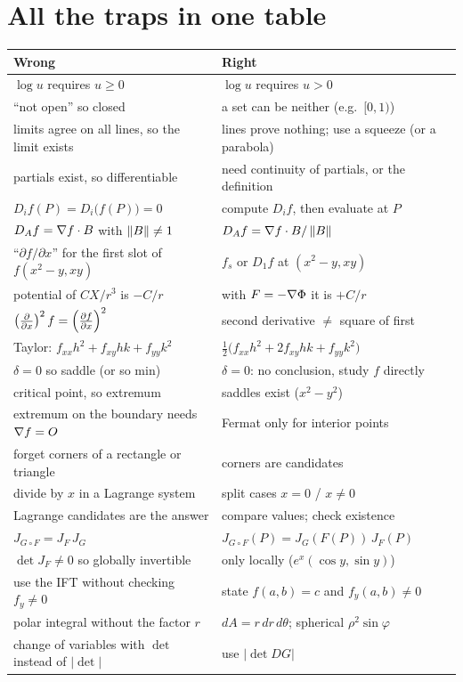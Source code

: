 \section{All the traps in one table}

\begin{center}\small
\begin{tabularx}{\linewidth}{@{}Y Y@{}}
\toprule
\textbf{\color{coralD}Wrong} & \textbf{\color{tealD}Right}\\ \midrule
$\log u$ requires $u\ge0$ & $\log u$ requires $u>0$\\
``not open'' so closed & a set can be neither (e.g.\ $[0,1)$)\\
limits agree on all lines, so the limit exists & lines prove nothing; use a squeeze (or a parabola)\\
partials exist, so differentiable & need continuity of partials, or the definition\\
$D_if(P)=D_i\big(f(P)\big)=0$ & compute $D_if$, then evaluate at $P$\\
$D_Af=\nabla f\cdot B$ with $\left\lVert B\right\rVert\ne1$ & $D_Af=\nabla f\cdot B/\left\lVert B\right\rVert$\\
``$\partial f/\partial x$'' for the first slot of $f(x^2-y,xy)$ & $f_s$ or $D_1f$ at $(x^2-y,xy)$\\
potential of $CX/r^3$ is $-C/r$ & with $F=-\nabla\Phi$ it is $+C/r$\\
$\left(\frac{\partial }{\partial x}\right)^2f=\left(\frac{\partial f}{\partial x}\right)^2$ & second derivative $\neq$ square of first\\
Taylor: $f_{xx}h^2+f_{xy}hk+f_{yy}k^2$ & $\tfrac12\big(f_{xx}h^2+2f_{xy}hk+f_{yy}k^2\big)$\\
$\delta=0$ so saddle (or so min) & $\delta=0$: no conclusion, study $f$ directly\\
critical point, so extremum & saddles exist ($x^2-y^2$)\\
extremum on the boundary needs $\nabla f=O$ & Fermat only for interior points\\
forget corners of a rectangle or triangle & corners are candidates\\
divide by $x$ in a Lagrange system & split cases $x=0$ / $x\ne0$\\
Lagrange candidates are the answer & compare values; check existence\\
$J_{G\circ F}=J_F\,J_G$ & $J_{G\circ F}(P)=J_G(F(P))\,J_F(P)$\\
$\det J_F\ne0$ so globally invertible & only locally ($e^x(\cos y,\sin y)$)\\
use the IFT without checking $f_y\ne0$ & state $f(a,b)=c$ and $f_y(a,b)\ne0$\\
polar integral without the factor $r$ & $dA=r\,dr\,d\theta$; spherical $\rho^2\sin\varphi$\\
change of variables with $\det$ instead of $|\det|$ & use $|\det DG|$\\
\bottomrule
\end{tabularx}
\end{center}

